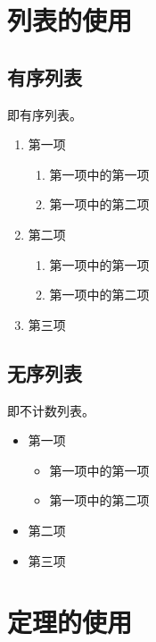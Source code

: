 \section{列表的使用}

\subsection{有序列表}

即有序列表。

\begin{enumerate}
    \item 第一项
        \begin{enumerate}
            \item 第一项中的第一项
            \item 第一项中的第二项
        \end{enumerate}
    \item 第二项
        \begin{enumerate}[label=(\roman*)]
            \item 第一项中的第一项
            \item 第一项中的第二项
        \end{enumerate}
    \item 第三项
\end{enumerate}

\subsection{无序列表}

即不计数列表。

\begin{itemize}
    \item 第一项
        \begin{itemize}
            \item 第一项中的第一项
            \item 第一项中的第二项
        \end{itemize}
    \item 第二项
    \item 第三项
\end{itemize}

\section{定理的使用}

